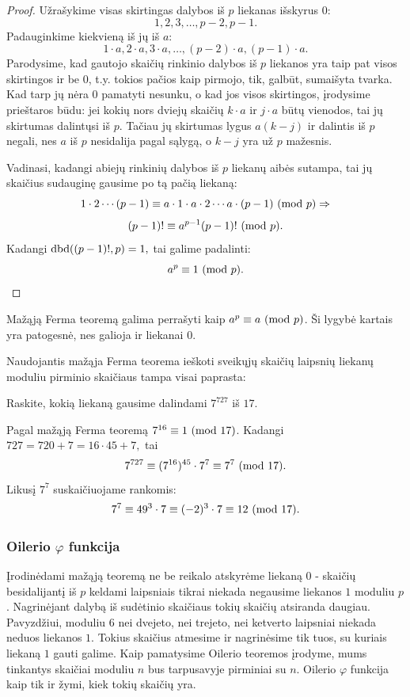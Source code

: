\begin{proof}
  Užrašykime visas skirtingas dalybos iš $p$ liekanas išskyrus $0$:
  $$1, 2, 3, \dots, p-2, p-1.$$
  Padauginkime kiekvieną iš jų iš $a$:
  $$1\cdot a, 2\cdot a, 3\cdot a, \dots, (p-2)\cdot a, (p-1)\cdot a.$$
  Parodysime, kad gautojo skaičių rinkinio dalybos iš $p$ liekanos yra taip
  pat visos skirtingos ir be 0, t.y. tokios pačios kaip pirmojo, tik, galbūt,
  sumaišyta tvarka. Kad tarp jų nėra 0 pamatyti nesunku, o kad jos visos
  skirtingos, įrodysime prieštaros būdu: jei kokių nors dviejų skaičių
  $k\cdot a$ ir $j\cdot a$ būtų vienodos, tai jų skirtumas dalintųsi iš
  $p$. Tačiau jų skirtumas lygus $a(k-j)$ ir dalintis iš $p$ negali, nes
  $a$ iš $p$ nesidalija pagal sąlygą, o $k-j$ yra už $p$ mažesnis. 

  Vadinasi, kadangi abiejų rinkinių dalybos iš $p$ liekanų aibės sutampa,
  tai jų skaičius sudauginę gausime po tą pačią liekaną:
  $$1\cdot 2 \cdots (p-1) \equiv a \cdot 1 \cdot a \cdot 2 \cdots a \cdot
  (p-1)\ (\text{mod } p)\Rightarrow$$
  $$(p-1)!\equiv a^{p-1}(p-1)!\ (\text{mod } p).$$
  Kadangi $\operatorname{dbd}((p-1)!,p)=1,$ tai galime padalinti:
  $$a^p\equiv 1 \ (\text{mod } p).$$
\end{proof}

\begin{pastaba}
  Mažąją Ferma teoremą galima perrašyti kaip $a^p \equiv a \ (\text{mod } p)$. Ši
  lygybė kartais yra patogesnė, nes galioja ir liekanai $0$.
\end{pastaba}
  
Naudojantis mažąja Ferma teorema ieškoti sveikųjų skaičių laipsnių liekanų
moduliu pirminio skaičiaus tampa visai paprasta:

\begin{pav}
  Raskite, kokią liekaną gausime dalindami $7^{727}$ iš $17$.
\end{pav}

Pagal mažąją Ferma teoremą $7^{16}\equiv 1 \ (\text{mod } 17)$. Kadangi $727 = 720 + 7
= 16\cdot 45 + 7,$ tai $$7^{727} \equiv (7^{16})^{45}\cdot 7^7\equiv 7^7
\ (\text{mod } 17).$$ Likusį $7^7$ suskaičiuojame rankomis: $$7^7 \equiv 49^3\cdot 7
\equiv (-2)^3\cdot 7\equiv 12 \ (\text{mod } 17).$$

\subsubsection{Oilerio $\varphi$ funkcija}

Įrodinėdami mažąją teoremą ne be reikalo atskyrėme liekaną $0$ - skaičių
besidalijantį iš $p$ keldami laipsniais tikrai niekada negausime liekanos
$1$ moduliu $p$. Nagrinėjant dalybą iš sudėtinio skaičiaus tokių skaičių
atsiranda daugiau. Pavyzdžiui, moduliu $6$ nei dvejeto, nei trejeto, nei
ketverto laipsniai niekada neduos liekanos $1$. Tokius skaičius atmesime ir
nagrinėsime tik tuos, su kuriais liekaną $1$ gauti galime. Kaip pamatysime Oilerio
teoremos įrodyme, mums tinkantys skaičiai moduliu $n$ bus tarpusavyje
pirminiai su $n$. Oilerio $\varphi$ funkcija kaip tik ir žymi, kiek tokių
skaičių yra.

